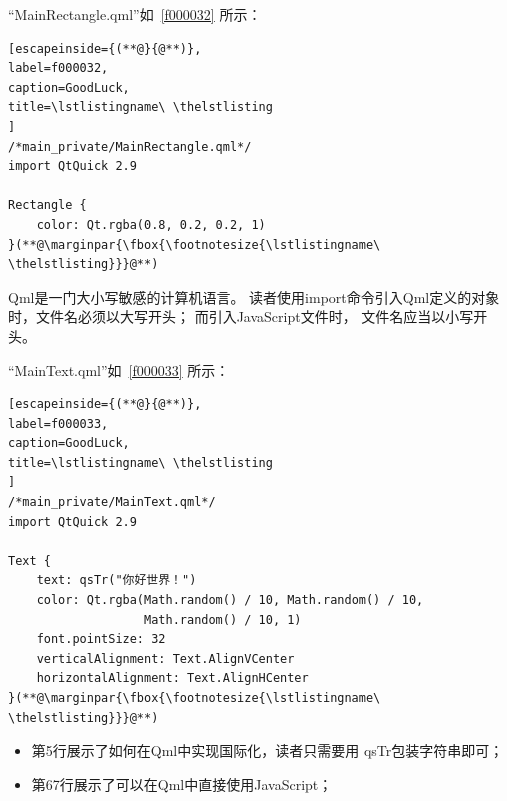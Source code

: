 “MainRectangle.qml”如\lstlistingname\ \ref{f000032}
所示：
\FloatBarrier
\begin{lstlisting}[escapeinside={(**@}{@**)},
label=f000032,
caption=GoodLuck,
title=\lstlistingname\ \thelstlisting
]
/*main_private/MainRectangle.qml*/
import QtQuick 2.9

Rectangle {
    color: Qt.rgba(0.8, 0.2, 0.2, 1)
}(**@\marginpar{\fbox{\footnotesize{\lstlistingname\ \thelstlisting}}}@**)\end{lstlisting}          %

Qml是一门大小写敏感的计算机语言。
读者使用import命令引入Qml定义的对象时，文件名必须以大写开头；
而引入JavaScript文件时，
文件名应当以小写开头。

“MainText.qml”如\lstlistingname\ \ref{f000033}
所示：

\FloatBarrier
\begin{lstlisting}[escapeinside={(**@}{@**)},
label=f000033,
caption=GoodLuck,
title=\lstlistingname\ \thelstlisting
]
/*main_private/MainText.qml*/
import QtQuick 2.9

Text {
    text: qsTr("你好世界！")
    color: Qt.rgba(Math.random() / 10, Math.random() / 10,
                   Math.random() / 10, 1)
    font.pointSize: 32
    verticalAlignment: Text.AlignVCenter
    horizontalAlignment: Text.AlignHCenter
}(**@\marginpar{\fbox{\footnotesize{\lstlistingname\ \thelstlisting}}}@**)\end{lstlisting}          %

\begin{itemize}

\item 第5行展示了如何在Qml中实现国际化，读者只需要用
qsTr包装字符串即可；
\item 第6\raisebox{0.16ex}{\sourcefonttwo\~{}}7行展示了可以在Qml中直接使用JavaScript；


\end{itemize}













